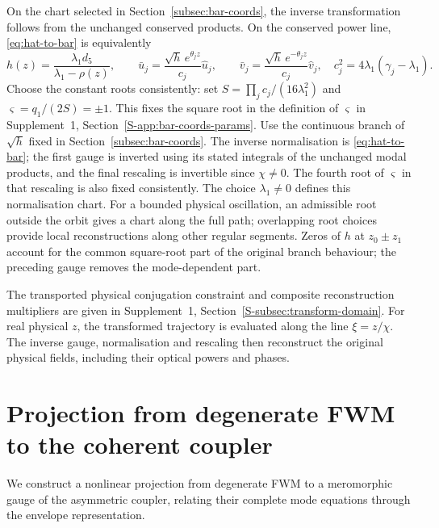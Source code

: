 \documentclass{optica-article}
\numberwithin{equation}{section}
\begin{document}
On the chart selected in Section~\ref{subsec:bar-coords}, the inverse transformation follows from the unchanged conserved products.
On the conserved power line, \eqref{eq:hat-to-bar} is equivalently
\begin{equation}
h(z)=\frac{\lambda_1d_5}{\lambda_1-\rho(z)},\qquad
\bar u_j=\frac{\sqrt h\,e^{\theta_jz}}{c_j}\hat u_j,\qquad
\bar v_j=\frac{\sqrt h\,e^{-\theta_jz}}{c_j}\hat v_j,
\quad c_j^2=4\lambda_1(\gamma_j-\lambda_1).
\label{eq:local-inverse-normalisation}
\end{equation}
Choose the constant roots consistently: set $S=\prod_jc_j/(16\lambda_1^2)$ and $\varsigma=q_1/(2S)=\pm1$.
This fixes the square root in the definition of $\varsigma$ in Supplement~1, Section~\ref*{S-app:bar-coords-params}.
Use the continuous branch of $\sqrt h$ fixed in Section~\ref{subsec:bar-coords}.
The inverse normalisation is \eqref{eq:hat-to-bar}; the first gauge is inverted using its stated integrals of the unchanged modal products, and the final rescaling is invertible since $\chi\ne0$.
The fourth root of $\varsigma$ in that rescaling is also fixed consistently.
The choice $\lambda_1\ne0$ defines this normalisation chart.
For a bounded physical oscillation, an admissible root outside the orbit gives a chart along the full path; overlapping root choices provide local reconstructions along other regular segments.
Zeros of $h$ at $z_0\pm z_1$ account for the common square-root part of the original branch behaviour; the preceding gauge removes the mode-dependent part.

The transported physical conjugation constraint and composite reconstruction multipliers are given in Supplement~1, Section~\ref*{S-subsec:transform-domain}.
For real physical $z$, the transformed trajectory is evaluated along the line $\xi=z/\chi$.
The inverse gauge, normalisation and rescaling then reconstruct the original physical fields, including their optical powers and phases.

\section{Projection from degenerate FWM to the coherent coupler}\label{cc:sec:coord-transforms}
We construct a nonlinear projection from degenerate FWM to a meromorphic gauge of the asymmetric coupler, relating their complete mode equations through the envelope representation.
\end{document}
